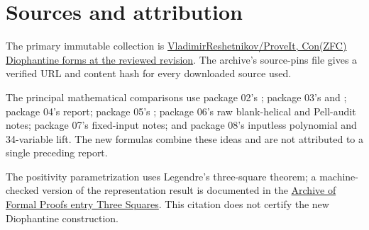 \documentclass[11pt]{article}
\begin{document}
\section*{Sources and attribution}

The primary immutable collection is
\href{https://github.com/VladimirReshetnikov/ProveIt/tree/3b201cdea32d2c816f5f3d20734051f25fd3ef14/SetTheory/Cardinals/docs/reports/hilbert-tenth-problem/con-zfc-diophantine-forms}{VladimirReshetnikov/ProveIt, Con(ZFC) Diophantine forms at the reviewed revision}.
The archive's source-pins file gives a verified URL and content hash for every downloaded source used.

The principal mathematical comparisons use package 02's
; package 03's
 and ; package 04's report; package 05's ; package 06's raw blank-helical and Pell-audit notes; package 07's fixed-input notes; and package 08's inputless polynomial and 34-variable lift. The new formulas combine these ideas and are not attributed to a single preceding report.

The positivity parametrization uses Legendre's three-square theorem; a machine-checked version of the representation result is documented in the
\href{https://isa-afp.org/entries/Three_Squares.html}{Archive of Formal Proofs entry Three Squares}.
This citation does not certify the new Diophantine construction.
\end{document}
